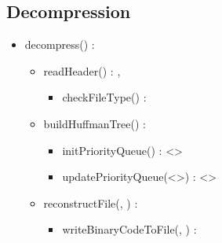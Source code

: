 \subsection{Decompression}


\begin{itemize}
    \item decompress(\binaryFile) : \binaryFile
    \begin{itemize}
        \item readHeader(\binaryFile) : \statistics, \booleen
        \begin{itemize}
            \item checkFileType(\binaryFile) : \booleen
        \end{itemize}
        \item buildHuffmanTree(\statistics) : \huffmanTree
        \begin{itemize}
            \item initPriorityQueue(\statistics) : \priorityQueue<\huffmanTree>
            \item updatePriorityQueue(\priorityQueue<\huffmanTree>) : \priorityQueue<\huffmanTree>
        \end{itemize}
        \item reconstructFile(\binaryFile, \huffmanTree) : \binaryFile
        \begin{itemize}
            \item writeBinaryCodeToFile(\binaryFile, \byte) : \binaryFile
        \end{itemize}
    \end{itemize}
\end{itemize}
